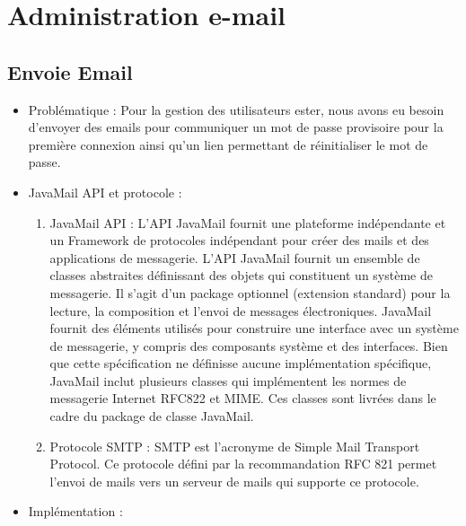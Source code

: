 \section{Administration e-mail}

\subsection{Envoie Email}

\begin{itemize}

\item Problématique :
Pour la gestion des utilisateurs ester, nous avons eu besoin d’envoyer des emails pour communiquer un mot de passe provisoire pour la première connexion ainsi qu’un lien permettant de réinitialiser le mot de passe.

\item JavaMail API et protocole :
    
\begin{enumerate}


\item JavaMail API :
L'API JavaMail fournit une plateforme indépendante et un Framework de protocoles indépendant pour créer des mails et des applications de messagerie. L'API JavaMail fournit un ensemble de classes abstraites définissant des objets qui constituent un système de messagerie. Il s’agit d’un package optionnel (extension standard) pour la lecture, la composition et l’envoi de messages électroniques. JavaMail fournit des éléments utilisés pour construire une interface avec un système de messagerie, y compris des composants système et des interfaces. Bien que cette spécification ne définisse aucune implémentation spécifique, JavaMail inclut plusieurs classes qui implémentent les normes de messagerie Internet RFC822 et MIME. Ces classes sont livrées dans le cadre du package de classe JavaMail.
\item Protocole SMTP :
SMTP est l'acronyme de Simple Mail Transport Protocol. Ce protocole défini par la recommandation RFC 821 permet l'envoi de mails vers un serveur de mails qui supporte ce protocole.

\end{enumerate}


\item Implémentation :

\begin{enumerate}


\end{enumerate}
\end{itemize}
